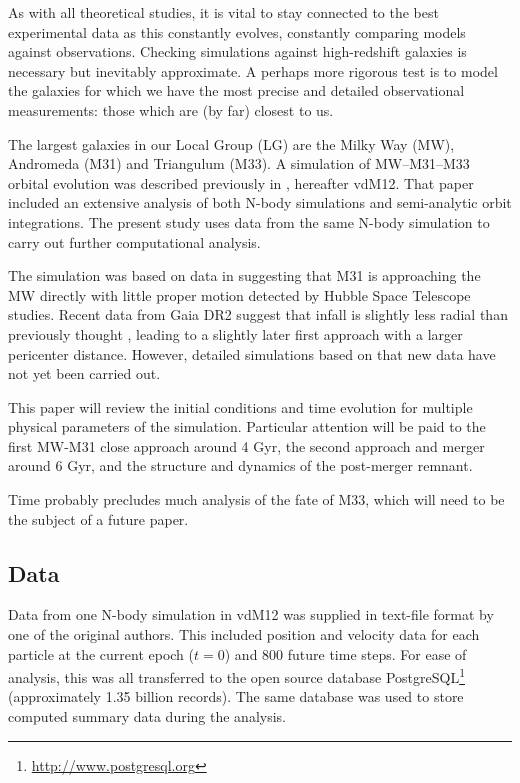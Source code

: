 \documentclass[twocolumn]{aastex63}
\begin{document}
As with all theoretical studies, it is vital to stay connected to the best experimental data as this constantly evolves, constantly comparing models against observations. Checking simulations against high-redshift galaxies is necessary but inevitably approximate. A perhaps more rigorous test is to model the galaxies for which we have the most precise and detailed observational measurements: those which are (by far) closest to us. 

The largest galaxies in our Local Group (LG) are the Milky Way (MW), Andromeda (M31) and Triangulum (M33).  A simulation of MW--M31--M33 orbital evolution was described previously in \citet{marel_m31_2012}, hereafter vdM12. That paper included an extensive analysis of both N-body simulations and semi-analytic orbit integrations. The present study uses data from the same N-body simulation to carry out further computational analysis.

The simulation was based on data in \citet{marel_m31_2012-1} suggesting that M31 is approaching the MW directly with little proper motion detected by Hubble Space Telescope studies. Recent data from Gaia DR2 \citep{brown_gaia_2018} suggest that infall is slightly less radial than previously thought \citep{marel_first_2019}, leading to a slightly later first approach with a larger pericenter distance. However, detailed simulations based on that new data have not yet been carried out.

This paper will review the initial conditions and time evolution for multiple physical parameters of the simulation. Particular attention will be paid to the first MW-M31 close approach around 4 Gyr, the second approach and merger around 6 Gyr, and the structure and dynamics of the post-merger remnant.

Time probably precludes much analysis of the fate of M33, which will need to be the subject of a future paper.

\subsection{Data}

Data from one N-body simulation in vdM12 was supplied in text-file format by one of the original authors. This included position and velocity data for each particle at the current epoch ($t=0$) and 800 future time steps. For ease of analysis, this was all transferred to the open source database PostgreSQL\footnote{\url{http://www.postgresql.org}} (approximately 1.35 billion records). The same database was used to store computed summary data during the analysis.
\end{document}
